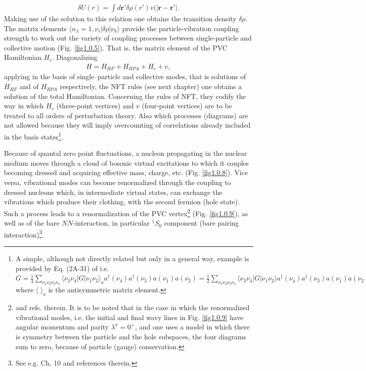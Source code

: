 \documentclass[a4paper,11pt]{book}
\numberwithin{equation}{section}
\numberwithin{figure}{section}
\numberwithin{table}{section}
\newcommand{\braket}[1]{\langle {#1} \rangle }
\begin{document}
\begin{align}\label{eq1.0.19}
\delta U(r)=\int d\mathbf r' \delta \rho(r')v(|\mathbf r-\mathbf r'|.
\end{align}
Making use  of the solution to this relation  one obtains the transition density $\delta\rho$. The matrix elements $\braket{n_\lambda=1, \nu_i|\delta\rho|\nu_k}$ provide the  particle-vibration coupling strength to work out the variety of coupling processes between single-particle and collective motion (Fig. \ref{fig1.0.5}). That is, the matrix element of the PVC Hamiltonian $H_c$. Diagonalizing 
\begin{align}\label{eq1.0.19b}
H=H_{HF}+H_{RPA}+H_c+v,
\end{align}
applying  in the basis of single--particle and collective modes, that is solutions of $H_{HF}$ and of $H_{RPA}$ respectively, the  NFT rules  (see next chapter) one obtains a solution of the total Hamiltonian. Concerning the rules of NFT, they codify the way in which $H_c$ (three-point vertices) and $v$ (four-point vertices) are to be treated to all orders of perturbation theory. Also which processes (diagrams) are not allowed because they will imply overcounting of correlations already included in the basis states\footnote{A simple, although not directly related but only in a general way, example is provided by Eq. (2A-31) of \cite{Bohr:69} i.e. $G=\tfrac{1}{4}\sum_{\nu_1\nu_2\nu_3\nu_4}\braket{\nu_3\nu_4|G|\nu_1\nu_2}_ aa^\dagger(\nu_4)a^\dagger(\nu_3)a(\nu_1)a(\nu_2)=\tfrac{1}{2}\sum_{\nu_1\nu_2\nu_3\nu_4}\braket{\nu_3\nu_4|G|\nu_1\nu_2} a^\dagger(\nu_4)a^\dagger(\nu_3)a(\nu_1)a(\nu_2)$ where $\braket{\;}_a$ is the antisymmetric matrix element.}. 


Because of quantal zero point fluctuations, a nucleon propagating in the nuclear medium moves through a cloud of bosonic  virtual excitations to which it couples becoming dressed and acquiring  effective mass, charge, etc. (Fig. \ref{fig1.0.8}). Vice versa, vibrational modes can become renormalized through the coupling to dressed nucleons which, in intermediate virtual states, can exchange the vibrations which produce their clothing, with the second fermion (hole state). Such a process leads to a renormalization of the PVC vertex\footnote{\label{footnote7} \cite{Bertsch:83,Barranco:04} and refs. therein. It is to be noted that in the case in which the renormalized vibrational modes, i.e. the initial and final wavy lines in Fig. \ref{fig1.0.9} have angular momentum and parity $\lambda^\pi=0^+$, and one uses a model in which there is symmetry between the particle and the hole subspaces, the four diagrams sum to zero, because of particle (gauge) conservation.} (Fig. \ref{fig1.0.9}), as well as of the bare $NN$-interaction, in particular $^1S_0$ component (bare pairing interaction)\footnote{See e.g. \cite{Brink:05} Ch. 10 and references therein.}. 
\end{document}
